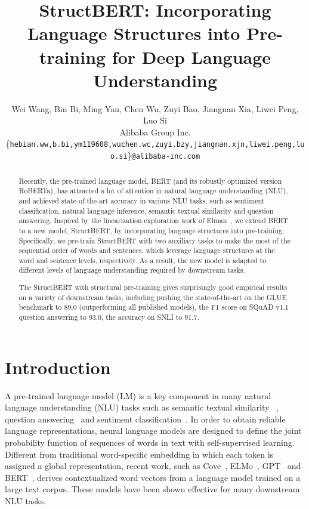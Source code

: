 \documentclass{article}
\title{StructBERT: Incorporating Language Structures into Pre-training for Deep Language Understanding}
\author{
Wei Wang, 
Bin Bi, 
Ming Yan, 
Chen Wu,
Zuyi Bao,
Jiangnan Xia,
Liwei Peng, 
Luo Si
 \\
Alibaba Group Inc. \\
 \{\texttt{hebian.ww,b.bi,ym119608,wuchen.wc,zuyi.bzy,jiangnan.xjn,liwei.peng,luo.si}\}\texttt{@alibaba-inc.com} \\
}
\begin{document}
\maketitle

\begin{abstract}
Recently, the pre-trained language model, BERT (and its robustly optimized version RoBERTa), has attracted a lot of attention in natural language understanding (NLU), and achieved state-of-the-art accuracy in various NLU tasks, such as sentiment classification, natural language inference, semantic textual similarity and question answering. Inspired by the linearization exploration work of Elman~\cite{elman1990finding}, we extend BERT to a new model, StructBERT, by incorporating language structures into pre-training. Specifically, we pre-train StructBERT with two auxiliary tasks to make the most of the sequential order of words and sentences, which leverage language structures at the word and sentence levels, respectively. As a result, the new model is adapted to different levels of language understanding required by downstream tasks.

The StructBERT with structural pre-training gives surprisingly good empirical results on a variety of downstream tasks, including pushing the state-of-the-art on the GLUE benchmark to 89.0 (outperforming all published models), the F1 score on SQuAD v1.1 question answering to 93.0, the accuracy on SNLI to 91.7.
\end{abstract}

\section{Introduction}
A pre-trained language model (LM) is a key component in many natural language understanding (NLU) tasks such as semantic textual similarity ~\cite{cer2017semeval}, question answering~\cite{rajpurkar2016squad} and sentiment classification~\cite{socher2013recursive}.
In order to obtain reliable language representations, neural language models are designed to define the joint probability function of sequences of words in text with self-supervised learning. Different from traditional word-specific embedding in which each token is assigned a global representation, recent work, such as Cove~\cite{mccann2017learned}, ELMo~\cite{peters2018deep}, GPT~\cite{radford2018improving} and BERT~\cite{devlin2018bert}, derives contextualized word vectors from a language model trained on a large text corpus. These models have been shown effective for many downstream NLU tasks.
\end{document}
